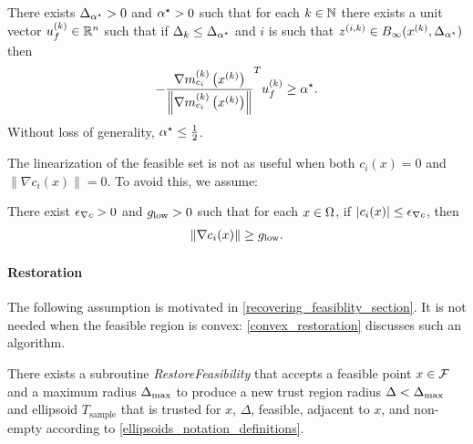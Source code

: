\begin{assumption}
\label{minangleassumption_alt}
There exists ${\Delta_{\alpha^{\star}}} > 0$ and ${ \alpha^{\star} } > 0$ such that for each $k \in \mathbb N$ there exists
a unit vector ${u^{(k)}_f} \in \mathbb R^n$
such that if $\Delta_k \le {\Delta_{\alpha^{\star}}}$ and
$i$ is such that ${z^{(i, k)}} \in B_{\infty}(x^{(k)}, {\Delta_{\alpha^{\star}}})$
then
\begin{align*}
-\frac {{\nabla m_{c_i}^{(k)}\left(x^{(k)}\right)}}{\left\|{\nabla m_{c_i}^{(k)}\left(x^{(k)}\right)}\right\|} ^T{u^{(k)}_f} \ge { \alpha^{\star} }.
\end{align*}
Without loss of generality, ${ \alpha^{\star} } \le \frac 1 2$.
\end{assumption}


% 

The linearization of the feasible set is not as useful when both $c_i(x) = 0$ and $\left\|\nabla c_i(x)\right\| = 0$.
To avoid this, we assume:
\begin{assumption}
\label{mingradassumption}
There exist ${\epsilon_{\nabla c}} > 0$ and ${ g_{\textrm{low}} } > 0$ such that for each $x \in \Omega$, if $\left|c_i(x)\right| \le {\epsilon_{\nabla c}}$, then
\begin{align*}
\| \nabla c_i(x) \| \ge { g_{\textrm{low}} }.
\end{align*}
\end{assumption}


\paragraph*{Restoration}

The following assumption is motivated in \cref{recovering_feasiblity_section}.
It is not needed when the feasible region is convex: \cref{convex_restoration} discusses such an algorithm.
\begin{assumption}
\label{restorability_assumption}
There exists a subroutine \emph{RestoreFeasibility} that accepts a feasible point $x \in {\mathcal F}$ and a maximum radius ${\Delta_{\textrm{max}}}$ to produce
a new trust region radius $\Delta < {\Delta_{\textrm{max}}}$ and ellipsoid $T_{\textrm{sample}}$ that is trusted for 
$x$, $\Delta$, feasible, adjacent to $x$, and non-empty according to \cref{ellipsoids_notation_definitions}.
\end{assumption}

